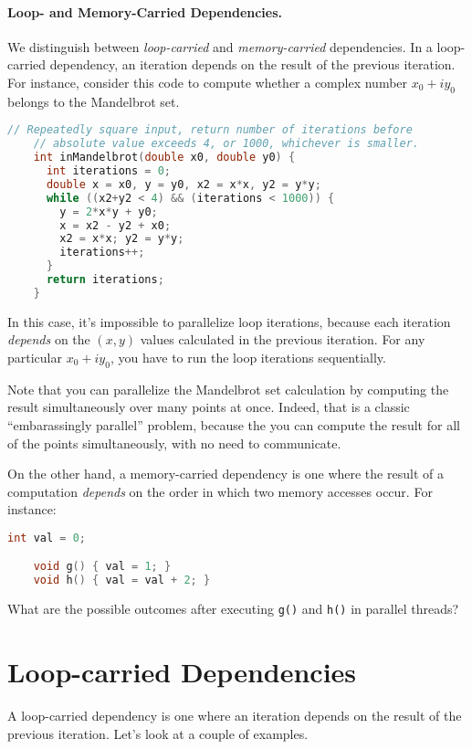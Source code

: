 \paragraph{Loop- and Memory-Carried Dependencies.} We distinguish
between \emph{loop-carried} and \emph{memory-carried} dependencies.
In a loop-carried dependency, an iteration depends on the result of
the previous iteration. For instance, consider this code to
compute whether a complex number $x_0 + iy_0$ belongs to the Mandelbrot
set.

{\small \begin{lstlisting}[language=C]
    // Repeatedly square input, return number of iterations before 
    // absolute value exceeds 4, or 1000, whichever is smaller.
    int inMandelbrot(double x0, double y0) {
      int iterations = 0;
      double x = x0, y = y0, x2 = x*x, y2 = y*y;
      while ((x2+y2 < 4) && (iterations < 1000)) {
        y = 2*x*y + y0;
        x = x2 - y2 + x0;
        x2 = x*x; y2 = y*y;
        iterations++;
      }
      return iterations;
    }
\end{lstlisting} }
In this case, it's impossible to parallelize loop iterations, because
each iteration \emph{depends} on the $(x, y)$ values calculated in the
previous iteration. For any particular $x_0 + iy_0$, you have to run the
loop iterations sequentially.

Note that you can parallelize the Mandelbrot set calculation
by computing the result simultaneously over many points at
once. Indeed, that is a classic ``embarassingly parallel'' problem,
because the you can compute the result for all of the points
simultaneously, with no need to communicate.

On the other hand, a memory-carried dependency is one where the result
of a computation \emph{depends} on the order in which two memory accesses
occur. For instance:

{\small \begin{lstlisting}[language=C]
    int val = 0;

    void g() { val = 1; }
    void h() { val = val + 2; }
\end{lstlisting} }

{\sf What are the possible outcomes after executing {\tt g()} and {\tt h()}
in parallel threads?} \\[1em]

\section*{Loop-carried Dependencies}
A loop-carried dependency is one where an
iteration depends on the result of the previous iteration. Let's look
at a couple of examples.


